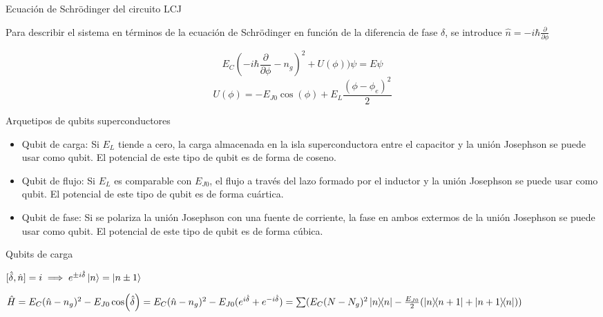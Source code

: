 \documentclass[spanish]{beamer}
\begin{document}
\begin{frame}{Ecuación de Schrödinger del circuito LCJ}
\protect\hypertarget{ecuaciuxf3n-de-schruxf6dinger-del-circuito-lcj}{}

Para describir el sistema en términos de la ecuación de Schrödinger en
función de la diferencia de fase \(\delta\), se introduce
\(\hat{n}=-i\hbar \frac{\partial}{\partial \phi}\)

\[E_C (-i\hbar \frac{\partial}{\partial\phi}-n_g)^2+U(\phi))\psi = E \psi\]
\[U(\phi) = -E_{J0} \cos(\phi)+E_L \frac{(\phi-\phi_e)^2}{2}\]

\end{frame}

\begin{frame}{Arquetipos de qubits superconductores}
\protect\hypertarget{arquetipos-de-qubits-superconductores}{}

\begin{itemize}
\item
  Qubit de carga: Si \(E_L\) tiende a cero, la carga almacenada en la
  isla superconductora entre el capacitor y la unión Josephson se puede
  usar como qubit. El potencial de este tipo de qubit es de forma de
  coseno.
\item
  Qubit de flujo: Si \(E_L\) es comparable con \(E_{J0}\), el flujo a
  través del lazo formado por el inductor y la unión Josephson se puede
  usar como qubit. El potencial de este tipo de qubit es de forma
  cuártica.
\item
  Qubit de fase: Si se polariza la unión Josephson con una fuente de
  corriente, la fase en ambos extermos de la unión Josephson se puede
  usar como qubit. El potencial de este tipo de qubit es de forma
  cúbica.
\end{itemize}

\end{frame}

\begin{frame}{Qubits de carga}
\protect\hypertarget{qubits-de-carga}{}

\([\hat{\delta},\hat{n}]=i \implies e^{\pm i \hat{\delta}} \ket{n} = \ket{n\pm 1}\)

\(\hat{H} = E_C (\hat{n}-n_g)^2 - E_{J0} \cos(\hat{\delta}) =  E_C (\hat{n}-n_g)^2 - E_{J0} (e^{i \hat{\delta}} + e^{-i \hat{\delta}}) =  \sum(E_C(N-N_g)^2 \ketbra{n}{n} - \frac{E_{J0}}{2}(\ketbra{n}{n+1}+\ketbra{n+1}{n}))\)

\end{frame}
\end{document}
